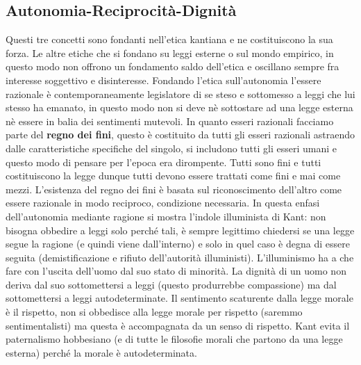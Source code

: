 \documentclass[10pt,a4paper]{article}
\begin{document}
\subsection{Autonomia-Reciprocità-Dignità}
Questi tre concetti sono fondanti nell'etica kantiana e ne costituiscono la sua forza. Le altre etiche che si fondano su leggi esterne o sul mondo empirico, in questo modo non offrono un fondamento saldo dell'etica e oscillano sempre fra interesse soggettivo e disinteresse. Fondando l'etica sull'autonomia l'essere razionale è contemporaneamente legislatore di se steso e sottomesso a leggi che lui stesso ha emanato, in questo modo non si deve nè sottostare ad una legge esterna nè essere in balia dei sentimenti mutevoli. In quanto esseri razionali facciamo parte del \textbf{regno dei fini}, questo è costituito da tutti gli esseri razionali astraendo dalle caratteristiche specifiche del singolo, si includono tutti gli esseri umani e questo modo di pensare per l'epoca era dirompente. Tutti sono fini e tutti costituiscono la legge dunque tutti devono essere trattati come fini e mai come mezzi. L'esistenza del regno dei fini è basata sul riconoscimento dell'altro come essere razionale in modo reciproco, condizione necessaria. In questa enfasi dell'autonomia mediante ragione si mostra l'indole illuminista di Kant: non bisogna obbedire a leggi solo perché tali, è sempre legittimo chiedersi se una legge segue la ragione (e quindi viene dall'interno) e solo in quel caso è degna di essere seguita (demistificazione e rifiuto dell'autorità illuministi). L'illuminismo ha a che fare con l'uscita dell'uomo dal suo stato di minorità. La dignità di un uomo non deriva dal suo sottomettersi a leggi (questo produrrebbe compassione) ma dal sottomettersi a leggi autodeterminate. Il sentimento scaturente dalla legge morale è il rispetto, non si obbedisce alla legge morale per rispetto (saremmo sentimentalisti) ma questa è accompagnata da un senso di rispetto. Kant evita il paternalismo hobbesiano (e di tutte le filosofie morali che partono da una legge esterna) perché la morale è autodeterminata. 

\newpage
\end{document}
